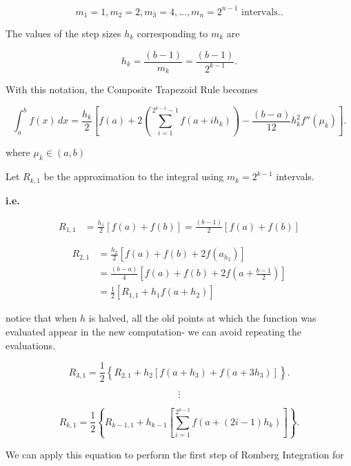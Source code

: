 \documentclass[12pt]{article}
\newcommand{\ie}{\textbf{i.e.}\xspace}
\begin{document}
\[
  m_1 = 1, m_2 = 2, m_3 = 4, \dots, m_n = 2^{n-1} \text{ intervals.} 
.\]

The values of the step sizes $h_k$ corresponding to $m_k$ are 

\[
  h_k = \frac{(b-1)}{m_k} = \frac{(b-1)}{2^{k-1}}
.\]

With this notation, the Composite Trapezoid Rule becomes

\begin{equation*}
  \int_{a}^{b} f(x) \, dx = \frac{h_k}{2} \left[
    f(a) + 2\left(
      \sum_{i=1}^{2^{k-1}-1} f(a+ih_k) 
      \right)
      - \frac{(b-a)}{12} h^2_k f''(\mu_k)
  \right]
.\end{equation*}

where $\mu_k \in (a,b)$

Let $R_{k,1}$ be the approximation to the integral using $m_k=2^{k-1}$
intervals.

\ie 

\begin{align*}
  R_{1,1} &=  \frac{h_1}{2}\left[
    f(a)+f(b)
  \right] = \frac{(b-1)}{2}
  \left[
    f(a)+f(b)
  \right]
\end{align*}

\begin{align*}
  R_{2,1} &= \frac{h_2}{2} \left[
    f(a)+f(b)+2f(a_h_2)
  \right] \\
          &= \frac{(b-a)}{4} \left[
            f(a)+f(b)+2f(a+\frac{b-1}{2})
          \right] \\
          &= \frac{1}{2} \left[
            R_{1,1} + h_1f(a+h_2)
          \right]
\end{align*}

notice that when $h$ is halved, all the old points at which the function was
evaluated appear in the new computation- we can avoid repeating the evaluations.

\begin{equation*}
  R_{3,1} = \frac{1}{2} \left\{
    R_{2,1} + h_2 \left[
      f(a+h_3) + f(a+3h_3)
    \right]
  \right\}
.\end{equation*} 

\[
\vdots
\]

\begin{equation*}
  R_{k,1} = \frac{1}{2} \left\{
    R_{k-1,1} + h_{k-1} \left[
      \sum_{i=1}^{2^{k-2}} f(a+(2i-1)h_k)
    \right]
  \right\}
.\end{equation*}

We can apply this equation to perform the first step of Romberg Integration for
\end{document}
